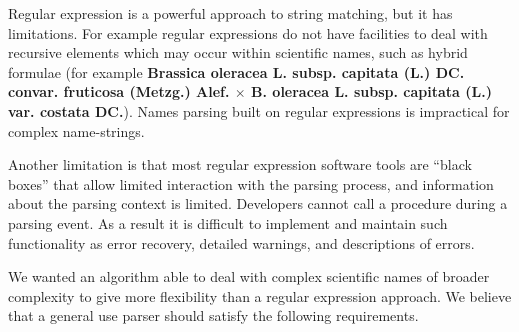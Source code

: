 \documentclass{bmcart}
\begin{document}
Regular expression is a powerful approach to string matching, but it has
limitations. For example regular expressions do not have facilities to deal
with recursive elements \cite{yu1997handbook} which may occur within scientific
names, such as hybrid formulae (for example \textbf{Brassica oleracea L.
subsp.  capitata (L.) DC. convar. fruticosa (Metzg.) Alef.  $\times$ B.
oleracea L. subsp. capitata (L.) var.  costata DC.}). Names parsing built on
regular expressions is impractical for complex name-strings.

Another limitation is that most regular expression software tools are ``black
boxes'' that allow limited interaction with the parsing process, and
information about the parsing context is limited. Developers cannot call a
procedure during a parsing event. As a result it is difficult to implement and
maintain such functionality as error recovery, detailed warnings, and
descriptions of errors.

We wanted an algorithm  able to deal with complex scientific names of broader
complexity to give more flexibility than a regular expression approach.  We
believe that a general use parser should satisfy the following requirements.
\end{document}
